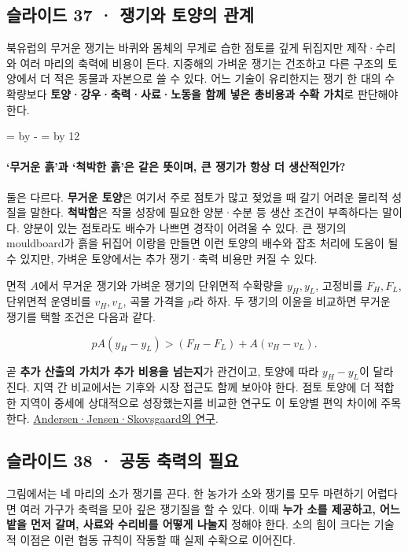 \documentclass[10pt,a4paper]{article}
\newcommand{\ReserveQuestionSpace}{%
  \par\begingroup
  \dimen0=\pagegoal \advance\dimen0 by -\pagetotal
  \dimen2=\baselineskip \multiply\dimen2 by 12
  \ifdim\dimen0<\dimen2 \newpage\fi
  \endgroup}
\begin{document}
\subsection{슬라이드 37 · 쟁기와 토양의 관계}
북유럽의 무거운 쟁기는 바퀴와 몸체의 무게로 습한 점토를 깊게 뒤집지만 제작·수리와 여러 마리의 축력에 비용이 든다. 지중해의 가벼운 쟁기는 건조하고 다른 구조의 토양에서 더 적은 동물과 자본으로 쓸 수 있다. 어느 기술이 유리한지는 쟁기 한 대의 수확량보다 \textbf{토양·강우·축력·사료·노동을 함께 넣은 총비용과 수확 가치}로 판단해야 한다.\par

\ReserveQuestionSpace
\paragraph{‘무거운 흙’과 ‘척박한 흙’은 같은 뜻이며, 큰 쟁기가 항상 더 생산적인가?}
둘은 다르다. \textbf{무거운 토양}은 여기서 주로 점토가 많고 젖었을 때 갈기 어려운 물리적 성질을 말한다. \textbf{척박함}은 작물 성장에 필요한 양분·수분 등 생산 조건이 부족하다는 말이다. 양분이 있는 점토라도 배수가 나쁘면 경작이 어려울 수 있다. 큰 쟁기의 mouldboard가 흙을 뒤집어 이랑을 만들면 이런 토양의 배수와 잡초 처리에 도움이 될 수 있지만, 가벼운 토양에서는 추가 쟁기·축력 비용만 커질 수 있다.\par

면적 $A$에서 무거운 쟁기와 가벼운 쟁기의 단위면적 수확량을 $y_H,y_L$, 고정비를 $F_H,F_L$, 단위면적 운영비를 $v_H,v_L$, 곡물 가격을 $p$라 하자. 두 쟁기의 이윤을 비교하면 무거운 쟁기를 택할 조건은 다음과 같다.\par

\[
pA(y_H-y_L)>(F_H-F_L)+A(v_H-v_L).
\]

곧 \textbf{추가 산출의 가치가 추가 비용을 넘는지}가 관건이고, 토양에 따라 $y_H-y_L$이 달라진다. 지역 간 비교에서는 기후와 시장 접근도 함께 보아야 한다. 점토 토양에 더 적합한 지역이 중세에 상대적으로 성장했는지를 비교한 연구도 이 토양별 편익 차이에 주목한다. \href{https://ehes.org/2015/01/15/the-heavy-plough-and-the-agricultural-revolution-in-medieval-europe/}{Andersen·Jensen·Skovsgaard의 연구}.\par

\subsection{슬라이드 38 · 공동 축력의 필요}
그림에서는 네 마리의 소가 쟁기를 끈다. 한 농가가 소와 쟁기를 모두 마련하기 어렵다면 여러 가구가 축력을 모아 깊은 쟁기질을 할 수 있다. 이때 \textbf{누가 소를 제공하고, 어느 밭을 먼저 갈며, 사료와 수리비를 어떻게 나눌지} 정해야 한다. 소의 힘이 크다는 기술적 이점은 이런 협동 규칙이 작동할 때 실제 수확으로 이어진다.\par
\end{document}
